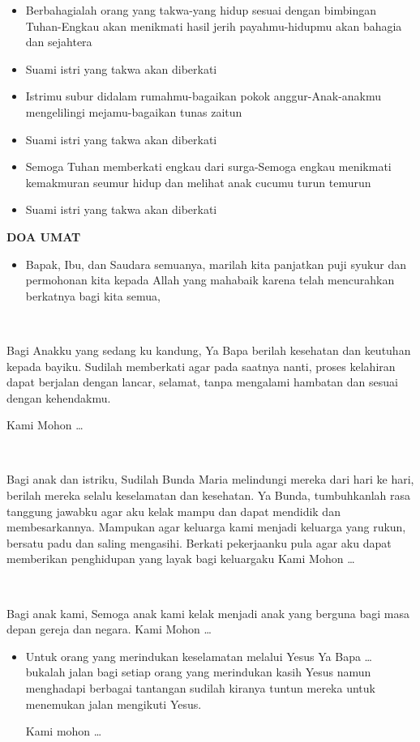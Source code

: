 \documentclass[a5paper,headsepline,titlepage,10pt,nnormalheadings,DIVcalc,twoside]{scrbook}
\makeatletter
\newcommand{\subjudul}[1]{%
  {\parindent \z@ 
    \interlinepenalty\@M \bfseries #1\par\nobreak \vskip 10\p@ }}
\renewenvironment{description}
               {\list{}{\labelwidth\z@ \itemindent-\leftmargin
                        \let\makelabel\descriptionlabel}}
               {\endlist}
\renewcommand*\descriptionlabel[1]{\hspace\labelsep 
                                \normalfont\bfseries #1 }
\newcommand{\BU}[1]{\begin{itemize} \item[U:] #1 \end{itemize}}
\newcommand{\BP}[1]{\begin{itemize} \item[P:] #1 \end{itemize}}
\makeatother
\begin{document}
\BP{Berbahagialah orang yang takwa-yang hidup sesuai dengan bimbingan Tuhan-Engkau akan menikmati hasil jerih payahmu-hidupmu akan bahagia dan sejahtera}

\BU{Suami istri yang takwa akan diberkati}

\BP{Istrimu subur didalam rumahmu-bagaikan pokok anggur-Anak-anakmu mengelilingi mejamu-bagaikan tunas zaitun}

\BU{Suami istri yang takwa akan diberkati}

\BP{Semoga Tuhan memberkati engkau dari surga-Semoga engkau menikmati kemakmuran seumur hidup dan melihat anak cucumu turun temurun}

\BU{Suami istri yang takwa akan diberkati}


\subjudul{DOA UMAT}
\BP{Bapak, Ibu, dan Saudara semuanya, marilah kita panjatkan puji syukur dan permohonan kita kepada Allah yang mahabaik karena telah mencurahkan berkatnya bagi kita semua,}

\begin{description}

\item[Oleh Calon Ibu]{~

Bagi Anakku yang sedang ku kandung,
Ya Bapa berilah kesehatan dan keutuhan kepada bayiku. Sudilah memberkati agar pada saatnya nanti, proses kelahiran dapat berjalan dengan lancar, selamat, tanpa mengalami hambatan dan sesuai dengan kehendakmu.

Kami Mohon \dots}


\item[Oleh Calon Bapak]{~

Bagi anak dan istriku, 
Sudilah Bunda Maria melindungi mereka dari hari ke hari, berilah mereka selalu keselamatan dan kesehatan. Ya Bunda, tumbuhkanlah rasa tanggung jawabku agar aku kelak mampu dan dapat mendidik dan membesarkannya. Mampukan agar keluarga kami menjadi keluarga yang rukun, bersatu padu dan saling mengasihi. Berkati pekerjaanku pula agar aku dapat memberikan penghidupan yang layak bagi keluargaku
Kami Mohon \dots}

\item[Oleh Calon Bapak dan Ibu]{~

Bagi anak kami,
Semoga anak kami kelak menjadi anak yang berguna bagi masa depan gereja dan negara.
Kami Mohon \dots}

\end{description}

\BP{Untuk orang yang merindukan keselamatan melalui Yesus
Ya Bapa … bukalah jalan bagi setiap orang yang merindukan kasih Yesus namun menghadapi berbagai tantangan sudilah kiranya tuntun mereka untuk menemukan jalan mengikuti Yesus.

Kami mohon \dots}
\end{document}
